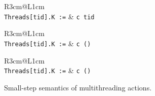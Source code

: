 \begin{figure}
\vspace{1.5em}

\begin{tabular}{R{3cm}@{\hspace{0.5em}}L{1cm}}
 \\ \toprule
\texttt{Threads[tid].K :=} & \texttt{c tid}
\end{tabular}

\vspace{1.5em}

\begin{tabular}{R{3cm}@{\hspace{0.5em}}L{1cm}}
 \\ \toprule
\texttt{Threads[tid].K :=} & \texttt{c ()}
\end{tabular}

\vspace{1.5em}

\begin{tabular}{R{3cm}@{\hspace{0.5em}}L{1cm}}
 \\ \toprule
\texttt{Threads[tid].K :=} & \texttt{c ()}
\end{tabular}
\caption{Small-step semantics of multithreading actions.}\label{fig:sem_multithreading}
\end{figure}

